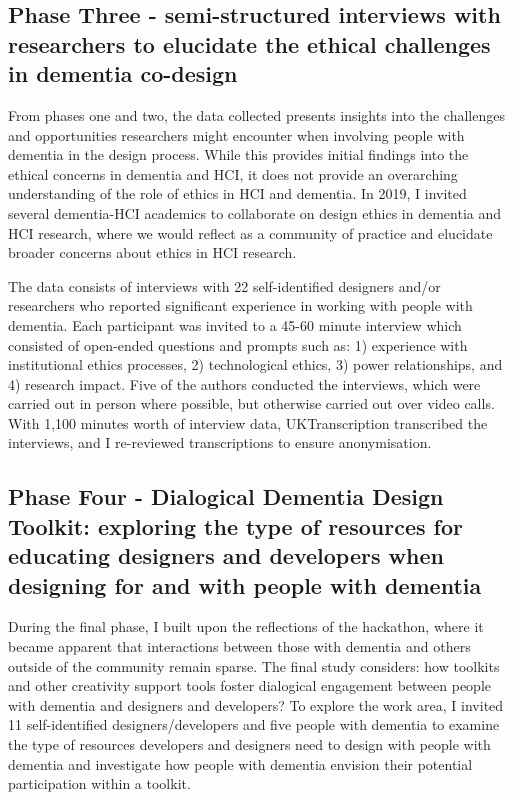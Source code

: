 \subsection{Phase Three - semi-structured interviews with researchers to elucidate the ethical challenges in dementia co-design}

From phases one and two, the data collected presents insights into the challenges and opportunities researchers might encounter when involving people with dementia in the design process. While this provides initial findings into the ethical concerns in dementia and HCI, it does not provide an overarching understanding of the role of ethics in HCI and dementia. In 2019, I invited several dementia-HCI academics to collaborate on design ethics in dementia and HCI research, where we would reflect as a community of practice and elucidate broader concerns about ethics in HCI research.

The data consists of interviews with 22 self-identified designers and/or researchers who reported significant experience in working with people with dementia. Each participant was invited to a 45-60 minute interview which consisted of open-ended questions and prompts such as: 1) experience with institutional ethics processes, 2) technological ethics,
3) power relationships, and 4) research impact. Five of the authors conducted the interviews, which were carried out in person where possible, but otherwise carried out over video calls. With 1,100 minutes worth of interview data, UKTranscription transcribed the interviews, and I re-reviewed transcriptions to ensure anonymisation.


\subsection{Phase Four - Dialogical Dementia Design Toolkit: exploring the type of resources for educating designers and developers when designing for and with people with dementia}

During the final phase, I built upon the reflections of the hackathon, where it became apparent that interactions between those with dementia and others outside of the community remain sparse. The final study considers: how toolkits and other creativity support tools foster dialogical engagement between people with dementia and designers and developers? To explore the work area, I invited 11 self-identified designers/developers and five people with dementia to examine the type of resources developers and designers need to design with people with dementia and investigate how people with dementia envision their potential participation within a toolkit.

